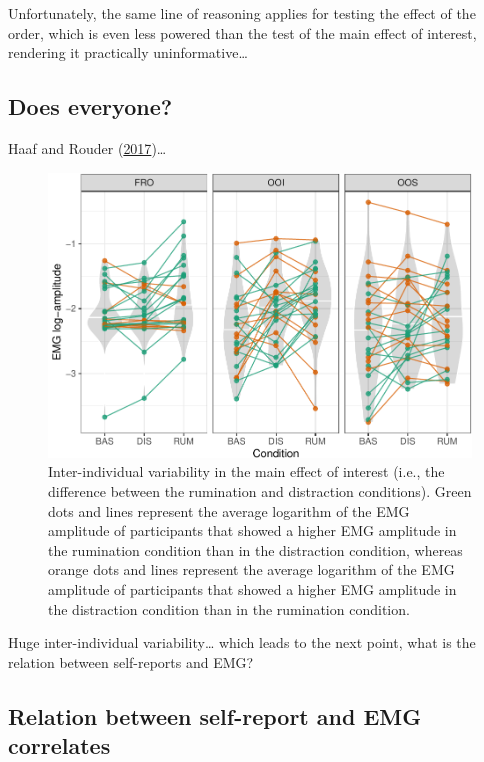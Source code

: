 \documentclass[
  english,
  man,floatsintext]{apa6}
\begin{document}
Unfortunately, the same line of reasoning applies for testing the effect of the order, which is even less powered than the test of the main effect of interest, rendering it practically uninformative\ldots{}

\hypertarget{does-everyone}{%
\subsection{Does everyone?}\label{does-everyone}}

Haaf and Rouder (\protect\hyperlink{ref-haaf_developing_2017}{2017})\ldots{}

\begin{figure}[!htb]

{\centering \includegraphics[width=1\linewidth]{reanalysis_files/figure-latex/everyone-1} 

}

\caption{Inter-individual variability in the main effect of interest (i.e., the difference between the rumination and distraction conditions). Green dots and lines represent the average logarithm of the EMG amplitude of participants that showed a higher EMG amplitude in the rumination condition than in the distraction condition, whereas orange dots and lines represent the average logarithm of the EMG amplitude of participants that showed a higher EMG amplitude in the distraction condition than in the rumination condition.}\label{fig:everyone}
\end{figure}

Huge inter-individual variability\ldots{} which leads to the next point, what is the relation between self-reports and EMG?

\hypertarget{relation-between-self-report-and-emg-correlates}{%
\subsection{Relation between self-report and EMG correlates}\label{relation-between-self-report-and-emg-correlates}}
\end{document}

